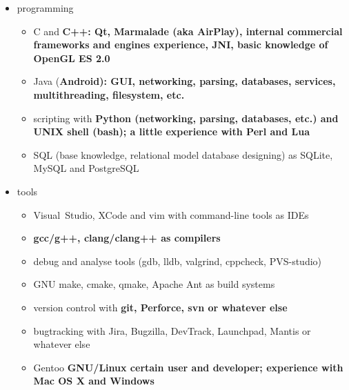 \begin{itemize}

\item programming

    \begin{itemize}
    \item C and \bfseries C++\mdseries:
    Qt, Marmalade (aka AirPlay), internal commercial frameworks and engines experience,
    \bfseries JNI\mdseries, basic knowledge of OpenGL ES 2.0


    \item Java (\bfseries Android\mdseries):
    GUI, networking, parsing, databases, services, multithreading, filesystem, etc.


    \item scripting with
    \bfseries Python \mdseries (networking, parsing, databases, etc.)
    and
    \bfseries UNIX shell (bash)\mdseries;
    a little experience with
    \bfseries Perl \mdseries and \bfseries Lua\mdseries

    \item SQL (base knowledge, relational model database designing)
as SQLite, MySQL and PostgreSQL
    \end{itemize}

\item tools

    \begin{itemize}
    \item Visual~Studio, XCode and vim with command-line tools as IDEs
    \item \bfseries gcc/g++\mdseries, clang/clang++ as compilers
    \item debug and analyse tools (gdb, lldb, valgrind, cppcheck, PVS-studio)
    \item GNU make, cmake, qmake, Apache Ant as build systems
    \item version control with \bfseries git\mdseries, Perforce, svn or whatever else
    \item bugtracking with Jira, Bugzilla, DevTrack, Launchpad, Mantis or whatever else
    \item Gentoo \bfseries GNU/Linux \mdseries certain user and developer;
    experience with \bfseries Mac OS X \mdseries and Windows
    \end{itemize}

\end{itemize}

